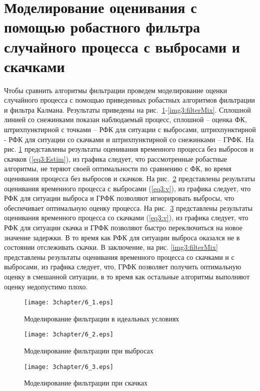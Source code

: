 \section{Моделирование оценивания с помощью робастного фильтра случайного процесса с выбросами и скачками} \label{sect3_6}
Чтобы сравнить алгоритмы фильтрации проведем моделирование оценки случайного процесса с помощью приведенных робастных алгоритмов фильтрации и фильтра Калмана. Результаты приведены на рис. \ref{img3:filterIdeal}-\ref{img3:filterMix}. Сплошной линией со снежинками показан наблюдаемый процесс, сплошной – оценка ФК, штрихпунктирной с точками – РФК для ситуации с выбросами, штрихпунктирной - РФК для ситуации со скачками и штрихпунктирной со снежинками – ГРФК. На рис. \ref{img3:filterIdeal} представлены результаты оценивания временного процесса без выбросов и скачков (\ref{eq3:Estim}), из графика следует, что рассмотренные робастные алгоритмы, не теряют своей оптимальности по сравнению с ФК, во время оценивания процесса без выбросов и скачков.
На рис. \ref{img3:filterVibros} представлены результаты оценивания временного процесса с выбросами (\ref{eq3:v}), из графика следует, что РФК для ситуации выброса и ГРФК позволяют игнорировать выбросы, что обеспечивает оптимальную оценку процесса.
На рис. \ref{img3:filterSkachok} представлены результаты оценивания временного процесса со скачками (\ref{eq3:v}), из графика следует, что РФК для ситуации скачка и ГРФК позволяют быстро переключиться на новое значение задержки. В то время как РФК для ситуации выброса оказался не в состоянии отслеживать скачки.
В заключение, на рис. \ref{img3:filterMix} представлены результаты оценивания временного процесса со скачками и с выбросами, из графика следует, что, ГРФК позволяет получить оптимальную оценку в смешанной ситуации, в то время как остальные алгоритмы выполняют оценку недопустимо плохо.

\begin{figure} [h]
  \center
\texttt{[image: 3chapter/6\_1.eps]}
  \caption{Моделирование фильтрации в идеальных условиях}
  \label{img3:filterIdeal}
\end{figure}

\begin{figure} [h]
  \center
\texttt{[image: 3chapter/6\_2.eps]}
  \caption{Моделирование фильтрации при выбросах}
  \label{img3:filterVibros}
\end{figure}

\begin{figure} [h]
  \center
\texttt{[image: 3chapter/6\_3.eps]}
  \caption{Моделирование фильтрации при скачках}
  \label{img3:filterSkachok}
\end{figure}

